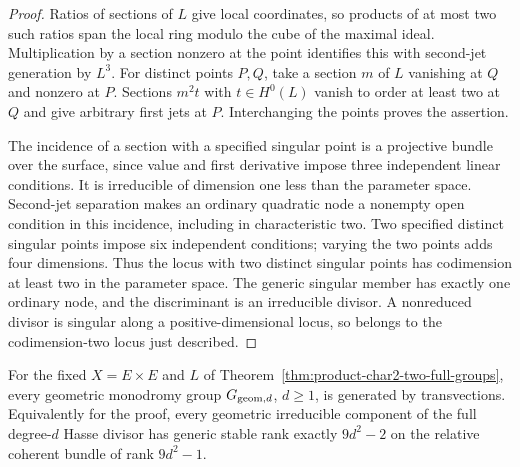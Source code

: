 \begin{proof}
Ratios of sections of $L$ give local coordinates, so products of
at most two such ratios span the local ring modulo the cube of
the maximal ideal.  Multiplication by a section nonzero at the
point identifies this with second-jet generation by $L^3$.
For distinct points $P,Q$, take a section $m$ of $L$ vanishing
at $Q$ and nonzero at $P$.  Sections $m^2t$ with $t\in H^0(L)$
vanish to order at least two at $Q$ and give arbitrary first
jets at $P$.  Interchanging the points proves the assertion.

The incidence of a section with a specified singular point is
a projective bundle over the surface, since value and first
derivative impose three independent linear conditions.  It is
irreducible of dimension one less than the parameter space.
Second-jet separation makes an ordinary quadratic node a nonempty
open condition in this incidence, including in characteristic two.
Two specified distinct singular points impose six independent
conditions; varying the two points adds four dimensions.
Thus the locus with two distinct singular points has codimension
at least two in the parameter space.  The generic singular member
has exactly one ordinary node, and the discriminant is an
irreducible divisor.  A nonreduced divisor is singular along a
positive-dimensional locus, so belongs to the codimension-two
locus just described.
\end{proof}

\begin{theorem}
\label{thm:product-all-degree-transvections}
For the fixed $X=E\times E$ and $L$ of
Theorem~\ref{thm:product-char2-two-full-groups}, every geometric
monodromy group $G_{{\rm geom},d}$, $d\ge1$, is generated by
transvections.  Equivalently for the proof, every geometric
irreducible component of the full degree-$d$ Hasse divisor has
generic stable rank exactly $9d^2-2$ on the relative coherent
bundle of rank $9d^2-1$.
\end{theorem}

